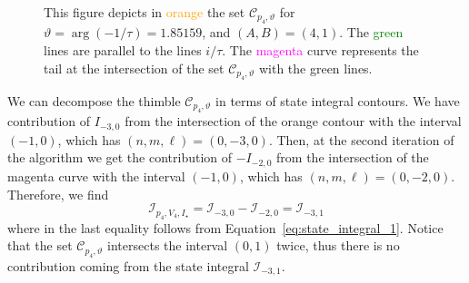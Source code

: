 \documentclass[12pt,reqno]{amsart}
\theoremstyle{definition}
\def\calI{\mathcal I}
\def\calC{\mathcal C}
\def\be{\begin{equation}}
\def\ee{\end{equation}}
\renewcommand{\=}{\;=\;}
\begin{document}
\begin{figure}[ht]
\begin{tiny}
\end{tiny}
\caption{This figure depicts in \textcolor{orange}{orange} the set $\calC_{p_4,\vartheta}$ for $\vartheta=\arg(-1/\tau)=1.85159$, and $(A,B)=(4,1)$. The \textcolor{green}{green} lines are parallel to the lines $i/\tau$. The \textcolor{magenta}{magenta} curve represents the tail at the intersection of the set $\calC_{p_4,\vartheta}$ with the green lines.}
\label{fig:after_FAKE_saddle.A4B1}
\end{figure}
%
\noindent We can decompose the thimble $\calC_{p_4,\vartheta}$ in terms of state integral contours. We have contribution of $I_{-3,0}$ from the intersection of the orange contour with the interval $(-1,0)$, which has $(n,m,\ell)=(0,-3,0)$. Then, at the second iteration of the algorithm we get the contribution of $-I_{-2,0}$ from the intersection of the magenta curve with the interval $(-1,0)$, which has $(n,m,\ell)=(0,-2,0)$. Therefore, we find 
\be\label{eq:region_Is_A4B1}
\calI_{p_4,V_4,I_\star}=\calI_{-3,0}-\calI_{-2,0}=\calI_{-3,1}
\ee
where in the last equality follows from Equation~\eqref{eq:state_integral_1}. Notice that the set $\calC_{p_4,\vartheta}$ intersects the interval $(0,1)$ twice, thus there is no contribution coming from the state integral $\calI_{-3,1}$. 
%
%
\end{document}
